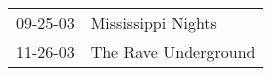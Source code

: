 \begin{supertabular}{p{0.07\textwidth}p{0.23\textwidth}}
 09-25-03 &    Mississippi Nights \\
 11-26-03 &  The Rave Underground \\
\end{supertabular}
